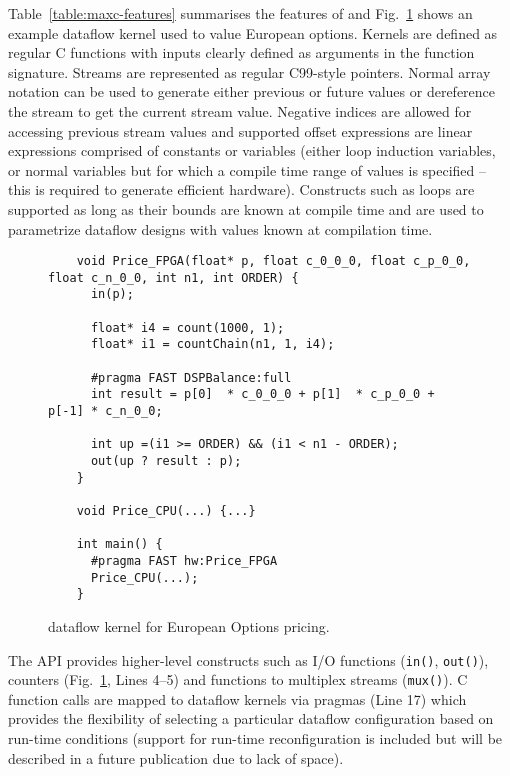 Table~\ref{table:maxc-features} summarises the features of \MAXC{} and
Fig.~\ref{fig:maxc-1dconv} shows an example dataflow kernel used to
value European options. Kernels are defined as regular C functions
with inputs clearly defined as arguments in the function
signature. Streams are represented as regular C99-style pointers.
Normal array notation can be used to generate either previous or
future values or dereference the stream to get the current stream
value. Negative indices are allowed for accessing previous stream
values and supported offset expressions are linear expressions
comprised of constants or variables (either loop induction variables,
or normal variables but for which a compile time range of values is
specified -- this is required to generate efficient
hardware). Constructs such as loops are supported as long as their
bounds are known at compile time and are used to parametrize dataflow
designs with values known at compilation time.

\lstset{style=MaxC}

\begin{figure}[!h]
  \begin{lstlisting}
    void Price_FPGA(float* p, float c_0_0_0, float c_p_0_0, float c_n_0_0, int n1, int ORDER) {
      in(p);

      float* i4 = count(1000, 1);
      float* i1 = countChain(n1, 1, i4);

      #pragma FAST DSPBalance:full
      int result = p[0]  * c_0_0_0 + p[1]  * c_p_0_0 + p[-1] * c_n_0_0;

      int up =(i1 >= ORDER) && (i1 < n1 - ORDER);
      out(up ? result : p);
    }

    void Price_CPU(...) {...}

    int main() {
      #pragma FAST hw:Price_FPGA
      Price_CPU(...);
    }
  \end{lstlisting}
  \caption{\MAXC{} dataflow kernel for European Options
    pricing.}
  \label{fig:maxc-1dconv}
\end{figure}


The \MAXC{} API provides higher-level constructs such as I/O functions
(\texttt{in()}, \texttt{out()}), counters (Fig.~\ref{fig:maxc-1dconv},
Lines 4--5) and functions to multiplex streams (\texttt{mux()}). C
function calls are mapped to dataflow kernels via pragmas (Line 17)
which provides the flexibility of selecting a particular dataflow
configuration based on run-time conditions (support for run-time
reconfiguration is included but will be described in a future
publication due to lack of space).
